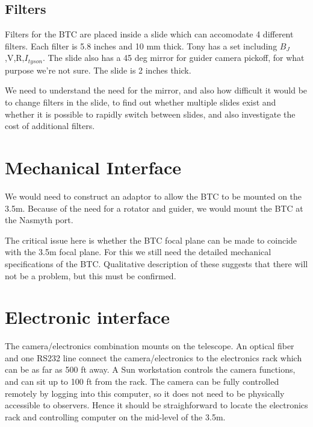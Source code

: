 \documentclass{article}
\begin{document}

\subsection{Filters}

Filters for the BTC are placed inside a slide which can accomodate 4
different filters.  Each filter is 5.8 inches and 10 mm thick. Tony has a set 
including $B_J$,V,R,$I_{tyson}$.  The slide also has a 45 deg mirror for guider 
camera pickoff, for what purpose we're not sure.  The slide is 2 inches thick.

We need to understand the need for the mirror, and also how difficult it
would be to change filters in the slide, to find out whether multiple
slides exist and whether it is possible to rapidly switch between slides,
and also investigate the cost of additional filters.

\section{Mechanical Interface}       

We would need to construct an adaptor to allow the BTC to be mounted
on the 3.5m. Because of the need for a rotator and guider, we would
mount the BTC at the Nasmyth port.

The critical issue here is whether the BTC focal plane can be made 
to coincide with the 3.5m focal plane. For this we still need the
detailed mechanical specifications of the BTC. Qualitative description
of these suggests that there will not be a problem, but this must
be confirmed. 


\section{Electronic interface}

The camera/electronics combination mounts on the telescope.
An optical fiber and one RS232 line connect the camera/electronics
to the electronics rack which can be as far as 500 ft away.  A Sun
workstation controls the camera functions, and can sit up to 100 ft
from the rack. The camera can be fully controlled remotely by logging
into this computer, so it does not need to be physically accessible
to observers. Hence it should be straighforward to locate the
electronics rack and controlling computer on the mid-level of the 3.5m.
\end{document}
